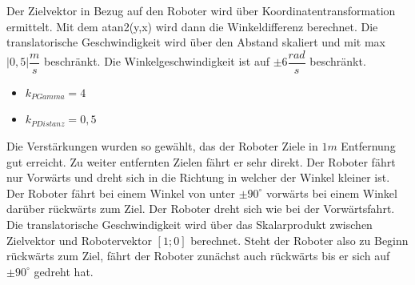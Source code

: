 Der Zielvektor in Bezug auf den Roboter wird über Koordinatentransformation ermittelt. Mit dem atan2(y,x) wird dann die Winkeldifferenz berechnet. Die translatorische Geschwindigkeit wird über den Abstand skaliert und mit max $|0,5| \dfrac{m}{s}$ beschränkt. Die Winkelgeschwindigkeit ist auf $\pm6 \dfrac{rad}{s}$ beschränkt.
\begin{itemize}
	\item $k_{PGamma} = 4$
	\item $k_{PDistanz} = 0,5$
\end{itemize}
Die Verstärkungen wurden so gewählt, das der Roboter Ziele in $1m$ Entfernung gut erreicht. Zu weiter entfernten Zielen fährt er sehr direkt.
Der Roboter fährt nur Vorwärts und dreht sich in die Richtung in welcher der Winkel kleiner ist.
Der Roboter fährt bei einem Winkel von unter $\pm90^{\circ}$ vorwärts bei einem Winkel darüber rückwärts zum Ziel.
Der Roboter dreht sich wie bei der Vorwärtsfahrt. Die translatorische Geschwindigkeit wird über das Skalarprodukt zwischen Zielvektor und Robotervektor $[1;0]$ berechnet. Steht der Roboter also zu Beginn rückwärts zum Ziel, fährt der Roboter zunächst auch rückwärts bis er sich auf $\pm90^{\circ}$ gedreht hat.


\newpage
